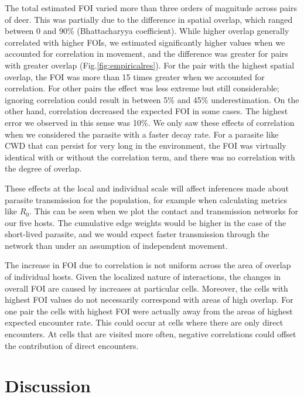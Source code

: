 \documentclass[letterpaper]{article}
\begin{document}
The total estimated FOI varied more than three orders of magnitude across pairs of deer. This was partially due to the difference in spatial overlap, which ranged between 0 and 90\% (Bhattacharyya coefficient). While higher overlap generally correlated with higher FOIs, we estimated significantly higher values when we accounted for correlation in movement, and the difference was greater for pairs with greater overlap (Fig.\ref{fig:empiricalres}). For the pair with the highest spatial overlap, the FOI was more than 15 times greater when we accounted for correlation. For other pairs the effect was less extreme but still considerable; ignoring correlation could result in between 5\% and 45\% underestimation. On the other hand, correlation decreased the expected FOI in some cases. The highest error we observed in this sense was 10\%. 
We only saw these effects of correlation when we considered the parasite with a faster decay rate. For a parasite like CWD that can persist for very long in the environment, the FOI was virtually identical with or without the correlation term, and there was no correlation with the degree of overlap.

These effects at the local and individual scale will affect inferences made about parasite transmission for the population, for example when calculating metrics like $R_0$. This can be seen when we plot the contact and transmission networks for our five hosts. The cumulative edge weights would be higher in the case of the short-lived parasite, and we would expect faster transmission through the network than under an assumption of independent movement. 

The increase in FOI due to correlation is not uniform across the area of overlap of individual hosts. Given the localized nature of interactions, the changes in overall FOI are caused by increases at particular cells. Moreover, the cells with highest FOI values do not necessarily correspond with areas of high overlap. For one pair the cells with highest FOI were actually away from the areas of highest expected encounter rate. This could occur at cells where there are only direct encounters. At cells that are visited more often, negative correlations could offset the contribution of direct encounters. 

\section*{Discussion}
\end{document}
